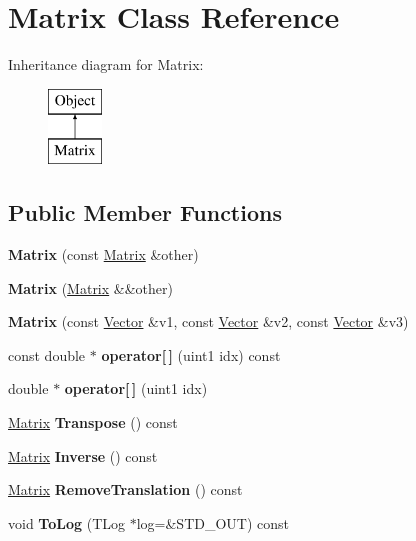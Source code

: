 \hypertarget{classMatrix}{}\section{Matrix Class Reference}
\label{classMatrix}
Inheritance diagram for Matrix\+:\begin{figure}[H]
\begin{center}
\leavevmode
\includegraphics[height=2.000000cm]{classMatrix}
\end{center}
\end{figure}
\subsection*{Public Member Functions}
\begin{DoxyCompactItemize}
\item 
\hypertarget{classMatrix_abcf708e864ed3d9db2c3b317c5e529ab}{}\label{classMatrix_abcf708e864ed3d9db2c3b317c5e529ab} 
{\bfseries Matrix} (const \hyperlink{classMatrix}{Matrix} \&other)
\item 
\hypertarget{classMatrix_aa8221a09ab250cb0c6cf65c53d43b780}{}\label{classMatrix_aa8221a09ab250cb0c6cf65c53d43b780} 
{\bfseries Matrix} (\hyperlink{classMatrix}{Matrix} \&\&other)
\item 
\hypertarget{classMatrix_a95c1e29ca70d8cadbcf55c6a86fbf837}{}\label{classMatrix_a95c1e29ca70d8cadbcf55c6a86fbf837} 
{\bfseries Matrix} (const \hyperlink{classBasicVector}{Vector} \&v1, const \hyperlink{classBasicVector}{Vector} \&v2, const \hyperlink{classBasicVector}{Vector} \&v3)
\item 
\hypertarget{classMatrix_a935f841ddb4536f45a5ec161ccec0d15}{}\label{classMatrix_a935f841ddb4536f45a5ec161ccec0d15} 
const double $\ast$ {\bfseries operator\mbox{[}$\,$\mbox{]}} (uint1 idx) const
\item 
\hypertarget{classMatrix_af5369ef5c65853353090112a676320c2}{}\label{classMatrix_af5369ef5c65853353090112a676320c2} 
double $\ast$ {\bfseries operator\mbox{[}$\,$\mbox{]}} (uint1 idx)
\item 
\hypertarget{classMatrix_ad0c96cdea0d2ae3403653ca90aa70796}{}\label{classMatrix_ad0c96cdea0d2ae3403653ca90aa70796} 
\hyperlink{classMatrix}{Matrix} {\bfseries Transpose} () const
\item 
\hypertarget{classMatrix_ad5f101877c4a10988bf7f128a9c248d8}{}\label{classMatrix_ad5f101877c4a10988bf7f128a9c248d8} 
\hyperlink{classMatrix}{Matrix} {\bfseries Inverse} () const
\item 
\hypertarget{classMatrix_aa64659e33d639e69716034b2091bdaf6}{}\label{classMatrix_aa64659e33d639e69716034b2091bdaf6} 
\hyperlink{classMatrix}{Matrix} {\bfseries Remove\+Translation} () const
\item 
\hypertarget{classMatrix_a05874398dc7839c74fb090c6bfe17e0a}{}\label{classMatrix_a05874398dc7839c74fb090c6bfe17e0a} 
void {\bfseries To\+Log} (T\+Log $\ast$log=\&S\+T\+D\+\_\+\+O\+UT) const
\end{DoxyCompactItemize}
